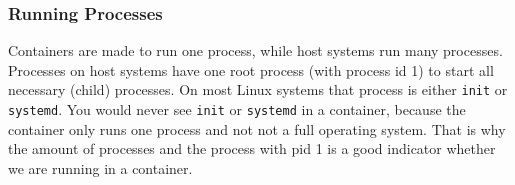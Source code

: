 \subsubsection{Running Processes}
Containers are made to run one process, while host systems run many processes. Processes on host systems have one root process (with process id 1) to start all necessary (child) processes. On most Linux systems that process is either \lstinline{init} or \lstinline{systemd}. You would never see \lstinline{init} or \lstinline{systemd} in a container, because the container only runs one process and not not a full operating system. That is why the amount of processes and the process with pid 1 is a good indicator whether we are running in a container.
